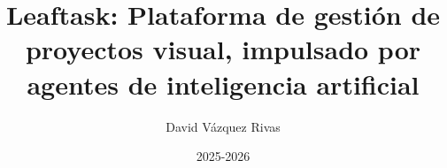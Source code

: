 \newcommand{\Titulo}{Leaftask: Plataforma de gestión de proyectos visual, impulsado por agentes de inteligencia artificial}
\newcommand{\Fecha}{2025-2026}

\newcommand{\Autor}{David Vázquez Rivas}
\newcommand{\Dni}{45613644K}

\newcommand{\Estudios}{Grado en Ingeniería Informática}
\newcommand{\Facultad}{Escuela Politécnica Superior}

\title{\Titulo}
\author{\Autor}
\date{2025-2026}
